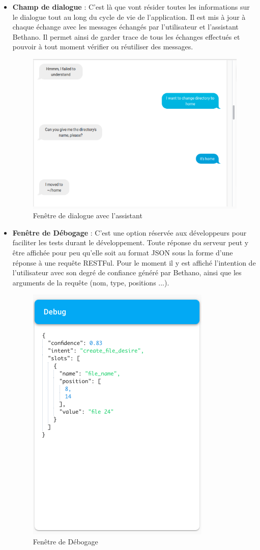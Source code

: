 \begin{itemize}
	\item \textbf{Champ de dialogue} : C'est là que vont résider toutes les informations sur le dialogue tout au long du cycle de vie de l'application. Il est mis à jour à chaque échange avec les messages échangés par l'utilisateur et l'assistant Bethano. Il permet ainsi de garder trace de tous les échanges effectués et pouvoir à tout moment vérifier ou réutiliser des messages.
	\begin{figure}[H]
		\centering
		\includegraphics[width=.6\linewidth]{images/Realisation/chat_box_yass.png}
		\caption{Fenêtre de dialogue avec l'assistant}
	\end{figure} 
	
	\item \textbf{Fenêtre de Débogage} : C'est une option réservée aux développeurs pour faciliter les tests durant le développement. Toute réponse du serveur peut y être affichée pour peu qu'elle soit au format JSON sous la forme d'une réponse à une requête RESTFul. Pour le moment il y est affiché l'intention de l'utilisateur avec son degré de confiance généré par Bethano, ainsi que les arguments de la requête (nom, type, positions ...).
	
	\begin{figure}[H]
		\centering
		\includegraphics[width=.4\linewidth]{images/Realisation/intent_box.png}
		\caption{Fenêtre de Débogage}
	\end{figure} 

\end{itemize}
